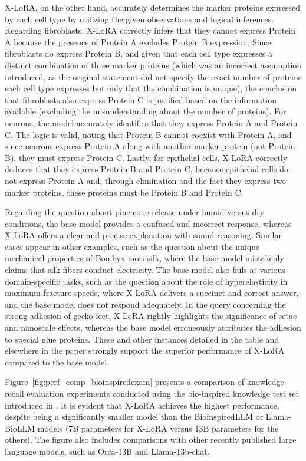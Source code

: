 X-LoRA, on the other hand, accurately determines the marker proteins expressed by each cell type by utilizing the given observations and logical inferences. Regarding fibroblasts, X-LoRA correctly infers that they cannot express Protein A because the presence of Protein A excludes Protein B expression. Since fibroblasts do express Protein B, and given that each cell type expresses a distinct combination of three marker proteins (which was an incorrect assumption introduced, as the original statement did not specify the exact number of proteins each cell type expresses but only that the combination is unique), the conclusion that fibroblasts also express Protein C is justified based on the information available (excluding the misunderstanding about the number of proteins). For neurons, the model accurately identifies that they express Protein A and Protein C. The logic is valid, noting that Protein B cannot coexist with Protein A, and since neurons express Protein A along with another marker protein (not Protein B), they must express Protein C. Lastly, for epithelial cells, X-LoRA correctly deduces that they express Protein B and Protein C, because epithelial cells do not express Protein A and, through elimination and the fact they express two marker proteins, these proteins must be Protein B and Protein C.

Regarding the question about pine cone release under humid versus dry conditions, the base model provides a confused and incorrect response, whereas X-LoRA offers a clear and precise explanation with sound reasoning. Similar cases appear in other examples, such as the question about the unique mechanical properties of Bombyx mori silk, where the base model mistakenly claims that silk fibers conduct electricity. The base model also fails at various domain-specific tasks, such as the question about the role of hyperelasticity in maximum fracture speeds, where X-LoRA delivers a succinct and correct answer, and the base model does not respond adequately. In the query concerning the strong adhesion of gecko feet, X-LoRA rightly highlights the significance of setae and nanoscale effects, whereas the base model erroneously attributes the adhesion to special glue proteins. These and other instances detailed in the table and elsewhere in the paper strongly support the superior performance of X-LoRA compared to the base model.

Figure~\ref{fig:perf_comp_bioinspiredexam} presents a comparison of knowledge recall evaluation experiments conducted using the bio-inspired knowledge test set introduced in \cite{Luu2023BioinspiredLLM:Materials}. It is evident that X-LoRA achieves the highest performance, despite being a significantly smaller model than the BioinspiredLLM or Llama-BioLLM models (7B parameters for X-LoRA versus 13B parameters for the others). The figure also includes comparisons with other recently published large language models, such as Orca-13B and Llama-13b-chat.

